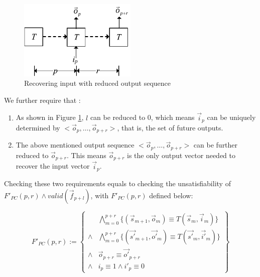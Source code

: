 \documentclass[runningheads,a4paper,orivec]{llncs}
\begin{document}
\begin{figure}[t]
\begin{center}
\includegraphics[width=0.5\textwidth]{pc1}
\end{center}
\caption{Recovering input with reduced output sequence}
  \label{fig_pc1}
\end{figure}

We further require that :
\begin{enumerate}
 \item As shown in Figure \ref{fig_pc1},
 $l$ can be reduced to 0,
 which means $\vec{i}_{p}$ can be uniquely determined by $<\vec{o}_{p},\dots,\vec{o}_{p+r}>$,
 that is,
 the set of future outputs.
 \item The above mentioned output sequence $<\vec{o}_{p},\dots,\vec{o}_{p+r}>$ 
 can be further reduced to $\vec{o}_{p+r}$.
 This means $\vec{o}_{p+r}$ is the only output vector needed to recover the input vector $\vec{i}_p$.
\end{enumerate}

Checking these two requirements
equals to checking the unsatisfiability of $F'_{PC}(p,r)\wedge valid(\vec{f}_{p+l})$,
with $F'_{PC}(p,r)$ defined below:

\begin{equation}\label{uniqt11}
F'_{PC}(p,r):=
\left\{
\begin{array}{cc}
&\bigwedge_{m=0}^{p+r}
\{
(\vec{s}_{m+1},\vec{o}_m)\equiv T(\vec{s}_m,\vec{i}_m)
\}
\\
\wedge&\bigwedge_{m=0}^{p+r}
\{
(\vec{s'}_{m+1},\vec{o'}_m)\equiv T(\vec{s'}_m,\vec{i'}_m)
\}
\\
\wedge&\vec{o}_{p+r}\equiv \vec{o'}_{p+r} \\
\wedge& i_{p}\equiv 1 \wedge  i'_{p}\equiv 0 
\end{array}
\right\}
\end{equation}
\end{document}
